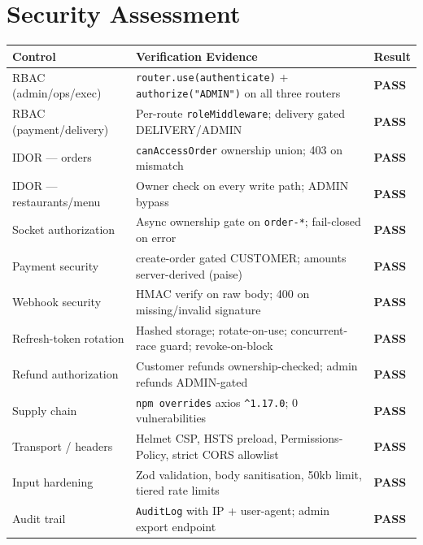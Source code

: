 \documentclass[11pt,a4paper]{article}
\newcommand{\cellok}[1]{\cellcolor{ok!15}\textbf{\color{ok}#1}}
\newcommand{\th}[1]{\textbf{\color{white}#1}}
\begin{document}
\newpage

\section{Security Assessment}

\begin{center}\footnotesize
\begin{longtable}{p{4.5cm}p{6.5cm}p{2.2cm}}
\toprule
\rowcolor{headbg}\th{Control} & \th{Verification Evidence} & \th{Result} \\
\midrule
\endhead
RBAC (admin/ops/exec) & \texttt{router.use(authenticate)} + \texttt{authorize("ADMIN")} on all three routers & \cellok{PASS} \\
\rowcolor{rowalt}RBAC (payment/delivery) & Per-route \texttt{roleMiddleware}; delivery gated DELIVERY/ADMIN & \cellok{PASS} \\
IDOR — orders & \texttt{canAccessOrder} ownership union; 403 on mismatch & \cellok{PASS} \\
\rowcolor{rowalt}IDOR — restaurants/menu & Owner check on every write path; ADMIN bypass & \cellok{PASS} \\
Socket authorization & Async ownership gate on \texttt{order-*}; fail-closed on error & \cellok{PASS} \\
\rowcolor{rowalt}Payment security & create-order gated CUSTOMER; amounts server-derived (paise) & \cellok{PASS} \\
Webhook security & HMAC verify on raw body; 400 on missing/invalid signature & \cellok{PASS} \\
\rowcolor{rowalt}Refresh-token rotation & Hashed storage; rotate-on-use; concurrent-race guard; revoke-on-block & \cellok{PASS} \\
Refund authorization & Customer refunds ownership-checked; admin refunds ADMIN-gated & \cellok{PASS} \\
\rowcolor{rowalt}Supply chain & \texttt{npm overrides} axios \texttt{\^{}1.17.0}; 0 vulnerabilities & \cellok{PASS} \\
Transport / headers & Helmet CSP, HSTS preload, Permissions-Policy, strict CORS allowlist & \cellok{PASS} \\
\rowcolor{rowalt}Input hardening & Zod validation, body sanitisation, 50kb limit, tiered rate limits & \cellok{PASS} \\
Audit trail & \texttt{AuditLog} with IP + user-agent; admin export endpoint & \cellok{PASS} \\
\bottomrule
\end{longtable}
\end{center}
\end{document}
